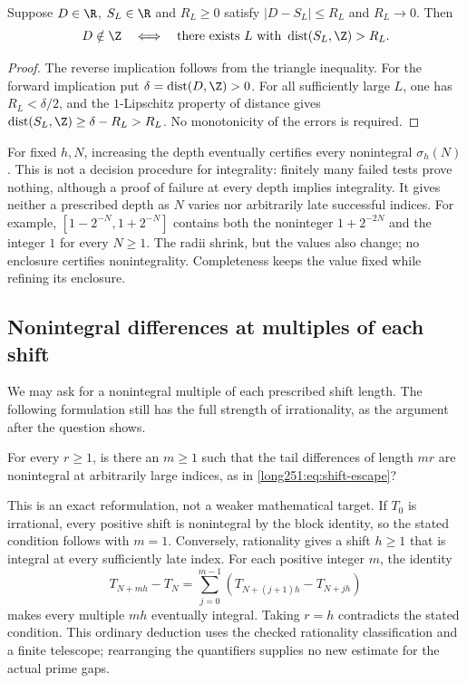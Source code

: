 \begin{proposition}\label{long251:res:complete-truncation}
Suppose $D\in\R$, $S_L\in\R$ and $R_L\ge0$ satisfy
$|D-S_L|\le R_L$ and $R_L\to0$.  Then
\[
 D\notin\Z\quad\Longleftrightarrow\quad
 \text{there exists }L\text{ with }\operatorname{dist}(S_L,\Z)>R_L.
\]
\end{proposition}
\begin{proof}
The reverse implication follows from the triangle inequality.
For the forward implication put $\delta=\operatorname{dist}(D,\Z)>0$.
For all sufficiently large $L$, one has $R_L<\delta/2$, and the
$1$-Lipschitz property of distance gives
$\operatorname{dist}(S_L,\Z)\ge\delta-R_L>R_L$.
No monotonicity of the errors is required.
\end{proof}
For fixed $h,N$, increasing the depth eventually certifies every
nonintegral $\sigma_h(N)$.  This is not a decision procedure for
integrality: finitely many failed tests prove nothing, although a
proof of failure at every depth implies integrality.  It gives neither
a prescribed depth as $N$ varies nor arbitrarily late successful indices.
For example, $[1-2^{-N},1+2^{-N}]$ contains both the noninteger
$1+2^{-2N}$ and the integer $1$ for every $N\ge1$.  The radii shrink,
but the values also change; no enclosure certifies nonintegrality.
Completeness keeps the value fixed while refining its enclosure.

\subsection{Nonintegral differences at multiples of each shift}\label{long251:sec:xr-divisorhit}

We may ask for a nonintegral multiple of each prescribed shift length.
The following formulation still has the full strength of irrationality,
as the argument after the question shows.

\begin{problem}\label{long251:xr:divisor-hit}
For every $r\ge1$, is there an $m\ge1$ such that the tail differences
of length $mr$ are nonintegral at arbitrarily large indices, as in
\eqref{long251:eq:shift-escape}?
\end{problem}

This is an exact reformulation, not a weaker mathematical target.
If $T_0$ is irrational, every positive shift is nonintegral by the block
identity, so the stated condition follows with $m=1$.  Conversely,
rationality gives a shift $h\ge1$ that is integral at every sufficiently
late index.  For each positive integer $m$, the identity
\[
 T_{N+mh}-T_N=\sum_{j=0}^{m-1}(T_{N+(j+1)h}-T_{N+jh})
\]
makes every multiple $mh$ eventually integral.  Taking $r=h$ contradicts
the stated condition.  This ordinary deduction uses the checked
rationality classification and a finite telescope; rearranging the
quantifiers supplies no new estimate for the actual prime gaps.

